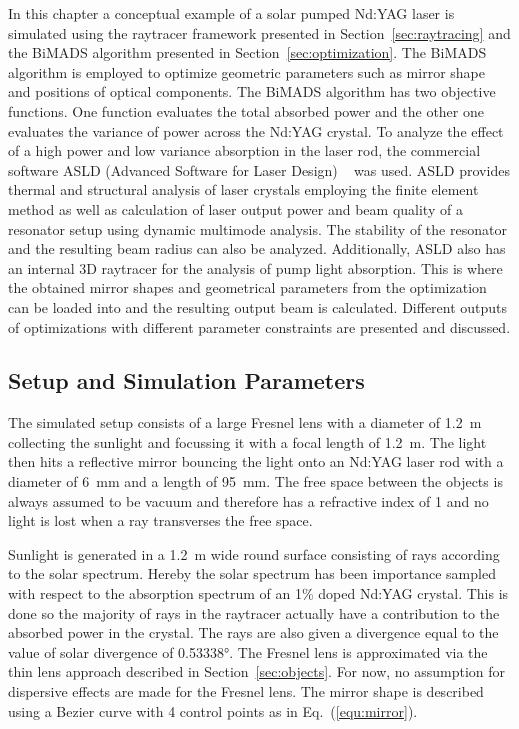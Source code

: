 \documentclass[a4paper,10pt]{article}
\newcommand{\equref}[1]{Eq.~(\ref{#1})}
\newcommand{\secref}[1]{Section~\ref{#1}}
\begin{document}
    In this chapter a conceptual example of a solar pumped Nd:YAG laser is
    simulated using the raytracer framework presented in \secref{sec:raytracing}
    and the BiMADS algorithm presented in \secref{sec:optimization}.
    The BiMADS algorithm is employed to optimize geometric parameters such
    as mirror shape and positions of optical components.
    The BiMADS algorithm has two objective functions.
    One function evaluates the total absorbed power and the other one
    evaluates the variance of power across the Nd:YAG crystal.
    To analyze the effect of a high power and low variance absorption
    in the laser rod, the commercial software ASLD (Advanced Software
    for Laser Design) ~\cite{asld_website} was used.
    ASLD provides thermal and structural analysis of laser crystals
    employing the finite element method as well as
    calculation of laser output power and beam quality of a resonator setup
    using dynamic multimode analysis.
    The stability of the resonator and the resulting beam radius
    can also be analyzed. 
    Additionally, ASLD also has an internal 3D raytracer for the analysis
    of pump light absorption.
    This is where the obtained mirror shapes and geometrical parameters
    from the optimization can be loaded into and the resulting output
    beam is calculated.
    Different outputs of optimizations with different parameter constraints
    are presented and discussed.

    \subsection{Setup and Simulation Parameters}
    
    The simulated setup consists of a large Fresnel lens with a 
    diameter of \SI{1.2}{m}
    collecting the sunlight and focussing it with a focal length of \SI{1.2}{m}.
    The light then hits a reflective mirror bouncing the light onto an Nd:YAG
    laser rod with a diameter of \SI{6}{mm} and a length of \SI{95}{mm}.
    The free space between the objects is always assumed to be vacuum and
    therefore has a refractive index of 1 and no light is lost when a 
    ray transverses the free space.

    Sunlight is generated in a \SI{1.2}{m} wide round surface consisting of
    rays according to the solar spectrum.
    Hereby the solar spectrum has been importance sampled with
    respect to the absorption spectrum of an 1\% doped Nd:YAG crystal.
    This is done so the majority of rays in the raytracer actually
    have a contribution to the absorbed power in the crystal.
    The rays are also given a divergence equal to the value of solar divergence
    of \ang{0.53338}.
    The Fresnel lens is approximated via the thin lens approach described
    in \secref{sec:objects}.
    For now, no assumption for dispersive effects are made for the
    Fresnel lens.
    The mirror shape is described using a Bezier curve with 4 control
    points as in \equref{equ:mirror}.
\end{document}

